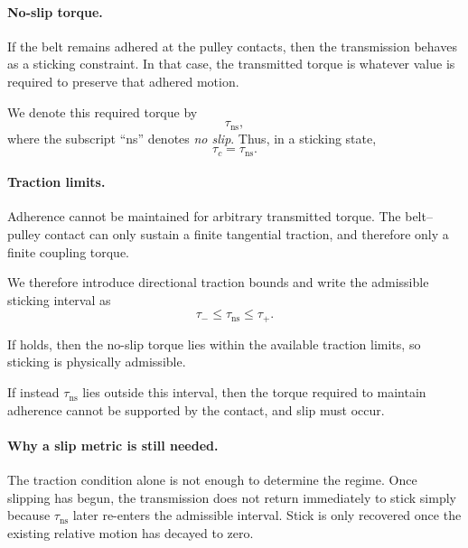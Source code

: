 \documentclass[11pt]{article}
\numberwithin{equation}{section}
\begin{document}
\paragraph{No-slip torque.}

If the belt remains adhered at the pulley contacts, then the transmission
behaves as a sticking constraint.
In that case, the transmitted torque is whatever value is required to preserve
that adhered motion.

We denote this required torque by
\begin{equation}
\tau_{\mathrm{ns}},
\end{equation}
where the subscript ``ns'' denotes \emph{no slip}.
Thus, in a sticking state,
\begin{equation}
\tau_c = \tau_{\mathrm{ns}}.
\end{equation}

\paragraph{Traction limits.}

Adherence cannot be maintained for arbitrary transmitted torque.
The belt--pulley contact can only sustain a finite tangential traction, and
therefore only a finite coupling torque.

We therefore introduce directional traction bounds and write the admissible
sticking interval as
\begin{equation}
\tau_- \le \tau_{\mathrm{ns}} \le \tau_+.
\label{eq:stick_admissible_interval}
\end{equation}

If  holds, then the no-slip torque lies within
the available traction limits, so sticking is physically admissible.

If instead $\tau_{\mathrm{ns}}$ lies outside this interval, then the torque
required to maintain adherence cannot be supported by the contact, and slip must
occur.

\paragraph{Why a slip metric is still needed.}

The traction condition alone is not enough to determine the regime.
Once slipping has begun, the transmission does not return immediately to stick
simply because $\tau_{\mathrm{ns}}$ later re-enters the admissible interval.
Stick is only recovered once the existing relative motion has decayed to zero.
\end{document}

